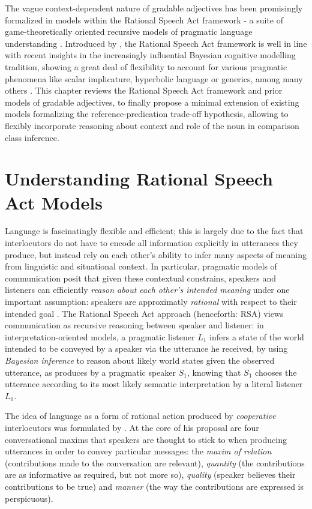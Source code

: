 The vague context-dependent nature of gradable adjectives has been promisingly formalized in models within the Rational Speech Act framework -  a suite of game-theoretically oriented recursive models of pragmatic language understanding \parencite[e.g.,][]{goodman2016, lassiter2017adjectival, tessler2017warm}. Introduced by \textcite{frank2012predicting}, the Rational Speech Act framework is well in line with recent insights in the increasingly influential Bayesian cognitive modelling tradition, showing a great deal of flexibility to account for various pragmatic phenomena like scalar implicature, hyperbolic language or generics, among many others \parencite[e.g.,][]{tenenbaum2011grow, problang}. This chapter reviews the Rational Speech Act framework and prior models of gradable adjectives, to finally propose a minimal extension of existing models formalizing the reference-predication trade-off hypothesis, allowing to flexibly incorporate reasoning about context and role of the noun in comparison class inference. 
  
\section{Understanding Rational Speech Act Models}

Language is fascinatingly flexible and efficient; this is largely due to the fact that interlocutors do not have to encode all information explicitly in utterances they produce, but instead rely on each other's ability to infer many aspects of meaning from linguistic and situational context. In particular, pragmatic models of communication posit that given these contextual constrains, speakers and listeners can efficiently \emph{reason about each other's intended meaning} under one important assumption: speakers are approximatly \emph{rational} with respect to their intended goal \parencite{frank2012predicting}. The Rational Speech Act approach (henceforth: RSA) views communication as recursive reasoning between speaker and listener: in interpretation-oriented models, a pragmatic listener $L_1$ infers a state of the world intended to be conveyed by a speaker via the utterance he received, by using \emph{Bayesian inference} to reason about likely world states given the observed utterance, as produces by a pragmatic speaker $S_1$, knowing that $S_1$ chooses the utterance according to its most likely semantic interpretation by a literal listener $L_0$.  

The idea of language as a form of rational action produced by \emph{cooperative} interlocutors was formulated by \textcite{grice1975logic}. At the core of his proposal are four conversational maxims that speakers are thought to stick to when producing utterances in order to convey particular messages: the \emph{maxim of relation} (contributions made to the conversation are relevant), \emph{quantity} (the contributions are as informative as required, but not more so), \emph{quality} (speaker believes their contributions to be true) and \emph{manner} (the way the contributions are expressed is perspicuous). 

